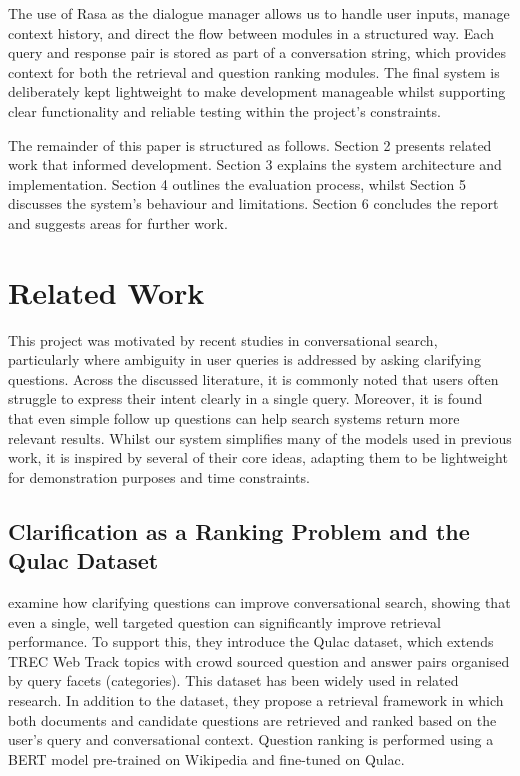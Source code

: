\documentclass[11pt]{article}
\begin{document}
The use of Rasa as the dialogue manager allows us to handle user inputs, manage context history, and direct the flow between modules in a structured way. Each query and response pair is stored as part of a conversation string, which provides context for both the retrieval and question ranking modules. The final system is deliberately kept lightweight to make development manageable whilst supporting clear functionality and reliable testing within the project's constraints.

The remainder of this paper is structured as follows. Section 2 presents related work that informed development. Section 3 explains the system architecture and implementation. Section 4 outlines the evaluation process, whilst Section 5 discusses the system's behaviour and limitations. Section 6 concludes the report and suggests areas for further work.

\section{Related Work}
This project was motivated by recent studies in conversational search, particularly where ambiguity in user queries is addressed by asking clarifying questions. Across the discussed literature, it is commonly noted that users often struggle to express their intent clearly in a single query. Moreover, it is found that even simple follow up questions can help search systems return more relevant results. Whilst our system simplifies many of the models used in previous work, it is inspired by several of their core ideas, adapting them to be lightweight for demonstration purposes and time constraints.

\subsection{Clarification as a Ranking Problem and the Qulac Dataset}
\citet{Aliannejadi2019} examine how clarifying questions can improve conversational search, showing that even a single, well targeted question can significantly improve retrieval performance. To support this, they introduce the Qulac dataset, which extends TREC Web Track topics with crowd sourced question and answer pairs organised by query facets (categories). This dataset has been widely used in related research. In addition to the dataset, they propose a retrieval framework in which both documents and candidate questions are retrieved and ranked based on the user's query and conversational context. Question ranking is performed using a BERT model pre-trained on Wikipedia and fine-tuned on Qulac.
\end{document}
